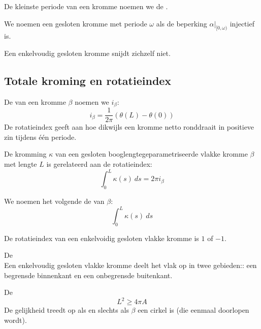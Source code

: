 \documentclass[main.tex]{subfiles}
\begin{document}
\begin{de}
  De kleinste periode van een kromme noemen we de .
\end{de}

\begin{de}
  We noemen een gesloten kromme met periode $\omega$  als de beperking $\alpha|_{[0,\omega)}$ injectief is. 
\end{de}

\begin{ei}
  Een enkelvoudig gesloten kromme snijdt zichzelf niet.
\end{ei}

\subsection{Totale kroming en rotatieindex}
\label{sec:totale-kroming-en}

\begin{de}
  De  van een kromme $\beta$ noemen we $i_{\beta}$:
  \[ i_{\beta} = \frac{1}{2\pi} (\theta(L) - \theta(0)) \]
  De rotatieindex geeft aan hoe dikwijls een kromme netto ronddraait in positieve zin tijdens \'e\'en periode.
\end{de}

\begin{st}
  De kromming $\kappa$ van een gesloten booglengtegeparametriseerde vlakke kromme $\beta$ met lengte $L$ is gerelateerd aan de rotatieindex:
  \[ \int_{0}^{L}\kappa(s)\ ds = 2\pi i_{\beta} \]
\end{st}

\begin{de}
  We noemen het volgende de  van $\beta$:
  \[ \int_{0}^{L}\kappa(s)\ ds \]
\end{de}

\begin{st}
  De rotatieindex van een enkelvoidig gesloten vlakke kromme is $1$ of $-1$.
\zb
\end{st}

\begin{st}
  De \\
  Een enkelvoudig gesloten vlakke kromme deelt het vlak op in twee gebieden:: een begrensde binnenkant en een onbegrensde buitenkant.
\zb
\end{st}

\begin{st}
  De \\
  \[ L^{2} \ge 4\pi A \]
  De gelijkheid treedt op als en slechts als $\beta$ een cirkel is (die eenmaal doorlopen wordt).
\zb
\end{st}
\end{document}
